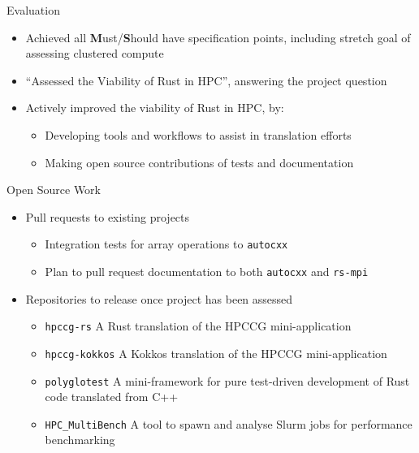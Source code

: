 \documentclass[10pt,aspectratio=169]{beamer}
\begin{document}
\begin{frame}{Evaluation}
    \begin{itemize}
        \item Achieved all \textbf{M}ust/\textbf{S}hould have specification points, including stretch goal of assessing clustered compute
        \item ``Assessed the Viability of Rust in HPC'', answering the project question
        \vspace{0.5cm}
        \item<2-> \alert{Actively improved} the viability of Rust in HPC, by:
        \begin{itemize}
            \item Developing tools and workflows to assist in translation efforts
            \item Making open source contributions of tests and documentation
        \end{itemize}
    \end{itemize}
\end{frame}


\begin{frame}{Open Source Work}
    \begin{itemize}
        \item Pull requests to existing projects
        \begin{itemize}
            \item Integration tests for array operations to \texttt{autocxx}
            \item Plan to pull request documentation to both \texttt{autocxx} and \texttt{rs-mpi}
        \end{itemize}
        \vspace*{0.25cm}
        \item Repositories to release once project has been assessed
        \begin{itemize}
            \item \texttt{hpccg-rs} A Rust translation of the HPCCG mini-application
            \item \texttt{hpccg-kokkos} A Kokkos translation of the HPCCG mini-application
            \item \texttt{polyglotest} A mini-framework for pure test-driven development of Rust code translated from C++
            \item \texttt{HPC\_MultiBench} A tool to spawn and analyse Slurm jobs for performance benchmarking
        \end{itemize}
    \end{itemize}
\end{frame}
\end{document}
